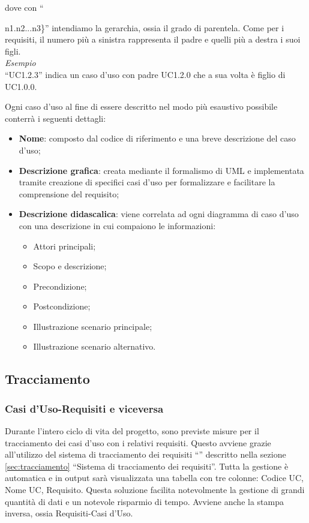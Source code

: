 dove con ``{n1.n2...n3\}'' intendiamo la gerarchia, ossia il grado di parentela. Come per i requisiti, il numero più a sinistra rappresenta il padre e quelli più a destra i suoi figli.\\

\textit{Esempio}\\
``UC1.2.3'' indica un caso d'uso con padre UC1.2.0 che a sua volta è figlio di UC1.0.0.

\clearpage
Ogni caso d'uso al fine di essere descritto nel modo più esaustivo possibile conterrà i seguenti dettagli:
\begin{itemize}
\item \textbf{Nome}: composto dal codice di riferimento e una breve descrizione del caso d'uso;
\item \textbf{Descrizione grafica}: creata mediante il formalismo di UML e implementata tramite creazione di specifici casi d'uso per formalizzare e facilitare la comprensione del requisito;
\item \textbf{Descrizione didascalica}: viene correlata ad ogni diagramma di caso d'uso con una descrizione in cui compaiono le informazioni:
\begin{itemize}
\item Attori principali;
\item Scopo e descrizione;
\item Precondizione;
\item Postcondizione;
\item Illustrazione scenario principale;
\item Illustrazione scenario alternativo.
\end{itemize}
\end{itemize}
\subsection{Tracciamento}

\subsubsection{Casi d'Uso-Requisiti e viceversa}
Durante l'intero ciclo di vita del progetto, sono previste misure per il tracciamento dei casi d'uso con i relativi requisiti. Questo avviene grazie all'utilizzo del sistema di tracciamento dei requisiti ``\manager{}'' descritto nella sezione \ref{sec:tracciamento} ``Sistema di tracciamento dei requisiti''. Tutta la gestione è automatica e in output sarà visualizzata una tabella con tre colonne: Codice UC, Nome UC, Requisito. Questa soluzione facilita notevolmente la gestione di grandi quantità di dati e un notevole risparmio di tempo. Avviene anche la stampa inversa, ossia Requisiti-Casi d'Uso.

}
